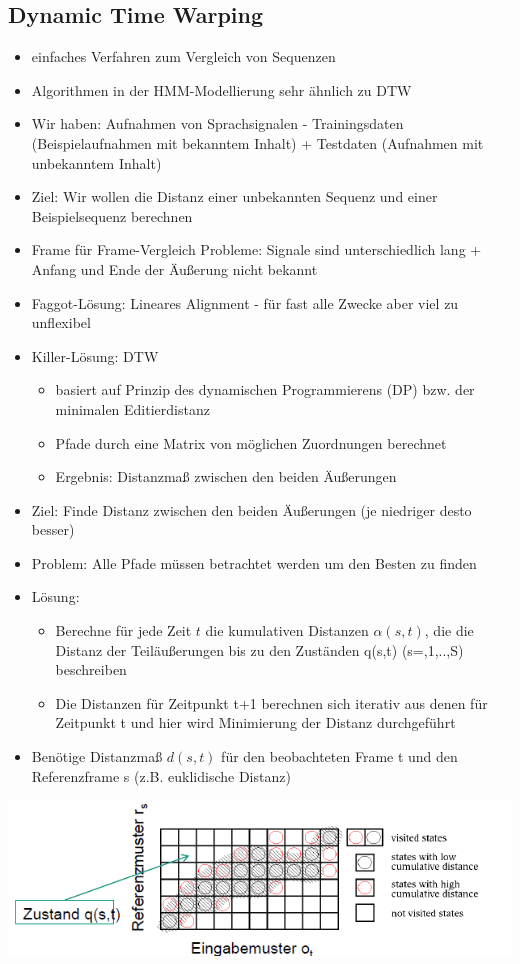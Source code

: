 \documentclass[a4paper,10pt,oneside]{article}
\begin{document}
\subsection{Dynamic Time Warping}
	\begin{itemize}
		\item einfaches Verfahren zum Vergleich von Sequenzen
		\item Algorithmen in der HMM-Modellierung sehr ähnlich zu DTW
		\item Wir haben: Aufnahmen von Sprachsignalen - Trainingsdaten (Beispielaufnahmen mit bekanntem Inhalt) + Testdaten (Aufnahmen mit unbekanntem Inhalt)
		\item Ziel: Wir wollen die Distanz einer unbekannten Sequenz und einer Beispielsequenz berechnen
		\item Frame für Frame-Vergleich Probleme: Signale sind unterschiedlich lang + Anfang und Ende der Äußerung nicht bekannt
		\item Faggot-Lösung: Lineares Alignment - für fast alle Zwecke aber viel zu unflexibel
		\item Killer-Lösung: DTW
				\begin{itemize}	
					\item basiert auf Prinzip des dynamischen Programmierens (DP) bzw. der minimalen Editierdistanz
					\item Pfade durch eine Matrix von möglichen Zuordnungen berechnet
					\item Ergebnis: Distanzmaß zwischen den beiden Äußerungen
				\end{itemize}
	
		\item Ziel: Finde Distanz zwischen den beiden Äußerungen (je niedriger desto besser)
		\item Problem: Alle Pfade müssen betrachtet werden um den Besten zu finden
		\item Lösung:
				\begin{itemize}
					\item Berechne für jede Zeit $t$ die kumulativen Distanzen $\alpha(s,t)$, die die Distanz der Teiläußerungen bis zu den Zuständen q(s,t) (s=,1,..,S)  beschreiben
					\item Die Distanzen für Zeitpunkt t+1 berechnen sich iterativ aus denen für Zeitpunkt t und hier wird Minimierung der Distanz durchgeführt
				\end{itemize}
					\item Benötige Distanzmaß $d(s,t)$ für den beobachteten Frame t und den Referenzframe s (z.B. euklidische Distanz)
 		\end{itemize}
 		\centering
 		\includegraphics[scale=0.65]{Grafiken/DTW_Beispiel.png}
 		
\end{document}

